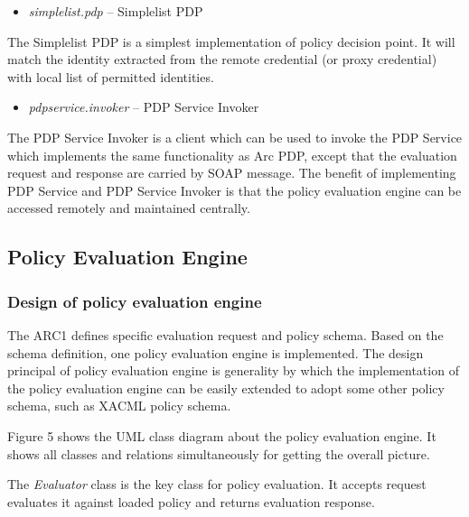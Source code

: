 \documentclass[a4paper]{article}
\newcommand\liststyleWWviiiNumxiii{%
\renewcommand\labelitemi{[F0B7?]}
\renewcommand\labelitemii{[F0B7?]}
\renewcommand\labelitemiii{[F0B7?]}
\renewcommand\labelitemiv{[F0B7?]}
}
\newcounter{Figure}
\begin{document}
\liststyleWWviiiNumxiii
\begin{itemize}
\item {\color{black}
\textit{simplelist.pdp} -- Simplelist PDP}
\end{itemize}
{\upshape\color{black}
The Simplelist PDP is a simplest implementation of policy decision
point. It will match the identity extracted from the remote credential
(or proxy credential) with local list of permitted identities.}

\liststyleWWviiiNumxiii
\begin{itemize}
\item {\color{black}
\textit{pdpservice.invoker} -- PDP Service Invoker}
\end{itemize}
{\upshape\color{black}
The PDP Service Invoker is a client which can be used to invoke the PDP
Service which implements the same functionality as Arc PDP, except that
the evaluation request and response are carried by SOAP message. The
benefit of implementing PDP Service and PDP Service Invoker is that the
policy evaluation engine can be accessed remotely and maintained
centrally.}

\subsection[Policy Evaluation Engine]{Policy Evaluation Engine}
\subsubsection{Design of policy evaluation engine}
{\upshape\color{black}
The ARC1 defines specific evaluation request and policy schema. Based on
the schema definition, one policy evaluation engine is implemented. The
design principal of policy evaluation engine is generality by which the
implementation of the policy evaluation engine can be easily extended
to adopt some other policy schema, such as XACML policy schema.}

{\upshape\color{black}
Figure 5 shows the UML class diagram about the policy evaluation engine.
It shows all classes and relations simultaneously for getting the
overall picture. }

{\upshape\color{black}
The \textit{Evaluator} class is the key class for policy evaluation. It
accepts request evaluates it against loaded policy and returns
evaluation response. }
\end{document}
